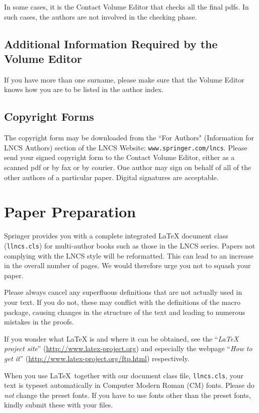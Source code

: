 \documentclass[runningheads,a4paper]{llncs}
\begin{document}
In some cases, it is the Contact Volume Editor that checks all the final
pdfs. In such cases, the authors are not involved in the checking phase.

\subsection{Additional Information Required by the Volume Editor}

If you have more than one surname, please make sure that the Volume Editor
knows how you are to be listed in the author index.

\subsection{Copyright Forms}

The copyright form may be downloaded from the ``For Authors"
(Information for LNCS Authors) section of the LNCS Website:
\texttt{www.springer.com/lncs}. Please send your signed copyright form
to the Contact Volume Editor, either as a scanned pdf or by fax or by
courier. One author may sign on behalf of all of the other authors of a
particular paper. Digital signatures are acceptable.

\section{Paper Preparation}

Springer provides you with a complete integrated \LaTeX{} document class
(\texttt{llncs.cls}) for multi-author books such as those in the LNCS
series. Papers not complying with the LNCS style will be reformatted.
This can lead to an increase in the overall number of pages. We would
therefore urge you not to squash your paper.

Please always cancel any superfluous definitions that are
not actually used in your text. If you do not, these may conflict with
the definitions of the macro package, causing changes in the structure
of the text and leading to numerous mistakes in the proofs.

If you wonder what \LaTeX{} is and where it can be obtained, see the
``\textit{LaTeX project site}'' (\url{http://www.latex-project.org})
and especially the webpage ``\textit{How to get it}''
(\url{http://www.latex-project.org/ftp.html}) respectively.

When you use \LaTeX\ together with our document class file,
\texttt{llncs.cls},
your text is typeset automatically in Computer Modern Roman (CM) fonts.
Please do
\emph{not} change the preset fonts. If you have to use fonts other
than the preset fonts, kindly submit these with your files.
\end{document}
